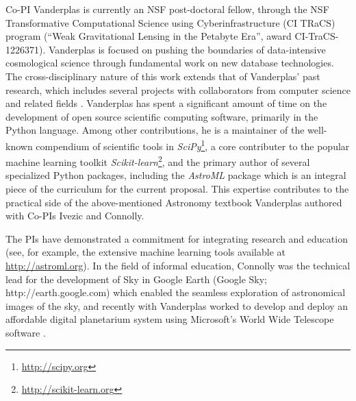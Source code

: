 Co-PI Vanderplas is currently an NSF post-doctoral fellow, through the NSF
Transformative Computational Science using Cyberinfrastructure (CI TRaCS)
program (``Weak Gravitational Lensing in the Petabyte Era'', award
CI-TraCS-1226371).
Vanderplas
is focused on pushing the boundaries of data-intensive cosmological science through
fundamental work on new database technologies. The cross-disciplinary nature
of this work extends that of Vanderplas' past research, which includes several
projects with collaborators from computer science and related fields
\cite{scikit-learn2, Xiong2011, daniel2011, scikit-learn1}.
Vanderplas has spent a significant amount of time on the development of
open source scientific computing software, primarily in the Python
language.  Among other contributions,
he is a maintainer of the well-known compendium of scientific tools in
{\it SciPy}\footnote{\url{http://scipy.org}}, a core contributer to the
popular machine learning toolkit
{\it Scikit-learn}\footnote{\url{http://scikit-learn.org}},
and the primary author of several specialized Python packages,
including the {\it AstroML} package which is an integral piece of the
curriculum for the current proposal.
This expertise contributes to the practical side of the above-mentioned
Astronomy textbook Vanderplas authored with Co-PIs Ivezic and Connolly.

The PIs have demonstrated a commitment for integrating research and
education (see, for example, the extensive machine learning tools
available at \url{http://astroml.org}). In the field of informal
education, Connolly was the technical lead for the development of Sky
in Google Earth (Google Sky; http://earth.google.com) which enabled
the seamless exploration of astronomical images of the sky, and
recently with Vanderplas worked to develop and deploy an affordable
digital planetarium system using Microsoft's World Wide Telescope
software \cite{rosenfield2011}.

